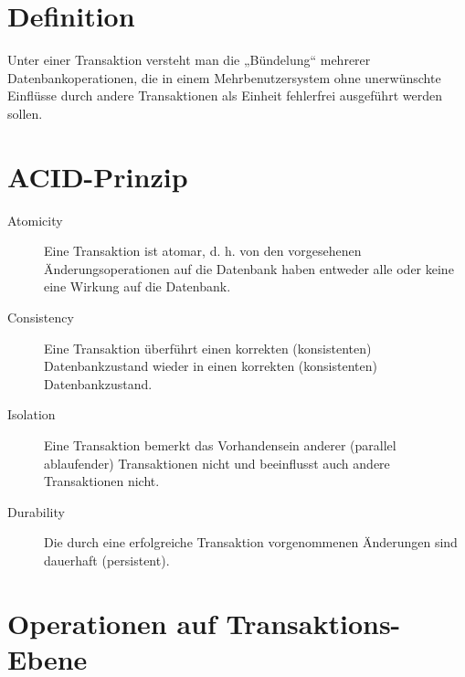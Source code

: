 \documentclass{lehramt-informatik}
\begin{document}
\section{Definition}

Unter einer Transaktion versteht man die „Bündelung“ mehrerer
Datenbankoperationen, die in einem Mehrbenutzersystem ohne unerwünschte
Einflüsse durch andere Transaktionen als Einheit fehlerfrei ausgeführt
werden sollen.

\section{ACID-Prinzip}

\begin{quellen}
\cite[Kapitel 9.5 „Eigenschaften Von Transaktionen“, Seite 299]{kemper}
\cite[Seite 1]{db:fs:5}
\cite{wiki:acid}
\end{quellen}

\begin{description}
\item[Atomicity]

Eine Transaktion ist atomar, d. h. von den vorgesehenen
Änderungsoperationen auf die Datenbank haben entweder alle oder keine
eine Wirkung auf die Datenbank.

\item[Consistency]

Eine Transaktion überführt einen korrekten (konsistenten)
Datenbankzustand wieder in einen korrekten (konsistenten)
Datenbankzustand.

\item[Isolation]

Eine Transaktion bemerkt das Vorhandensein anderer (parallel
ablaufender) Transaktionen nicht und beeinflusst auch andere
Transaktionen nicht.

\item[Durability]

Die durch eine erfolgreiche Transaktion vorgenommenen Änderungen sind
dauerhaft (persistent).

\end{description}

\section{Operationen auf Transaktions-Ebene}

\begin{quellen}
\item \cite[Seite 5]{db:fs:5}
\item \cite[Seite 211]{winter}
\end{quellen}
\end{document}
